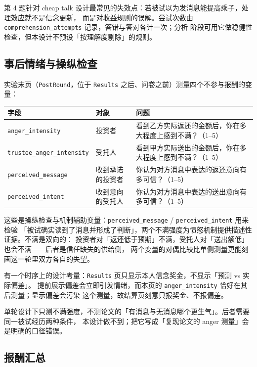 \documentclass[10pt,a4paper]{ctexart}
\newcommand{\code}[1]{\texttt{#1}}
\begin{document}
第 4 题针对 cheap talk 设计最常见的失效点：若被试以为发消息能提高乘子，处理效应就不是信念更新，
而是对收益规则的误解。尝试次数由 \code{comprehension\_attempts} 记录，答错与答对各计一次；分析
阶段可用它做稳健性检查，但本设计不预设「按理解度剔除」的规则。

\subsection{事后情绪与操纵检查}

实验末页（\code{PostRound}，位于 \code{Results} 之后、问卷之前）测量四个不参与报酬的变量：

\begin{table}[h]
\centering\small
\begin{tabular}{p{4.8cm}p{2.2cm}p{7.6cm}}
\toprule
字段 & 对象 & 问题 \\
\midrule
\code{anger\_intensity} & 投资者 & 看到乙方实际返还的金额后，你在多大程度上感到不满？（1--5） \\
\code{trustee\_anger\_intensity} & 受托人 & 看到甲方实际送出的金额后，你在多大程度上感到不满？（1--5） \\
\code{perceived\_message} & 收到承诺的投资者 & 你认为对方消息中表达的返还意向有多可信？（1--5） \\
\code{perceived\_intent} & 收到意向的受托人 & 你认为对方消息中表达的送出意向有多可信？（1--5） \\
\bottomrule
\end{tabular}
\end{table}

这些是操纵检查与机制辅助变量：\code{perceived\_message} / \code{perceived\_intent} 用来检验
「被试确实读到了消息并形成了判断」，两个不满强度为愤怒机制提供描述性证据。不满是双向的：
投资者对「返还低于预期」不满，受托人对「送出额低」也会不满——后者是信任缺失的供给侧，
两个变量的对偶比较比单侧测量更能刻画这一轮里双方各自的失望。

有一个时序上的设计考量：\code{Results} 页只显示本人信念奖金，不显示「预测 vs 实际偏差」。
提前展示偏差会立即引发情绪，而本页的 \code{anger\_intensity} 恰好在其后测量；显示偏差会污染
这个测量，故结算页刻意只报奖金、不报偏差。

单轮设计下只测不满强度，不测论文的「有消息与无消息哪个更生气」。后者需要同一被试经历两种条件，
本设计做不到；把它写成「复现论文的 anger 测量」会是明确的口径错误。

\subsection{报酬汇总}
\end{document}
